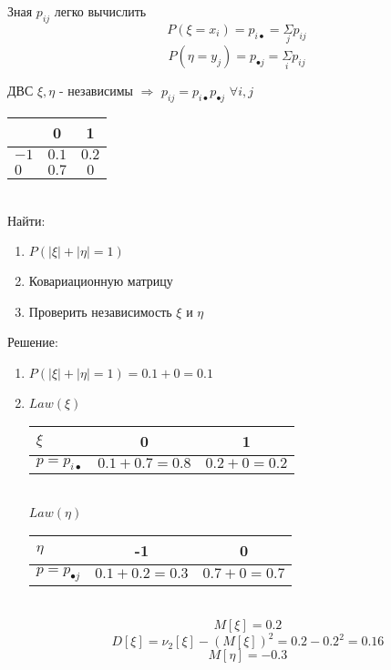 Зная $p_{ij}$ легко вычислить
$$
P(\xi = x_i) = p_{i\bullet} = \underset{j}{\Sigma}p_{ij}
$$
$$
P(\eta = y_j) = p_{\bullet j} = \underset{i}{\Sigma}p_{ij}
$$

\begin{theorem}
    ДВС $\xi,\eta$ - независимы $\Rightarrow$ $p_{ij} = p_{i\bullet}p_{\bullet j}$ $\forall i,j$
\end{theorem}

\begin{example}
    \begin{tabular}{|l|c|c|}
        \hline
        \diagbox{$\eta$}{$\xi$} & 0 & 1 \\ \hline
        $-1$ & $0.1$ & $0.2$ \\ \hline
        $0$ & $0.7$ & $0$ \\ \hline
    \end{tabular} \\
    Найти:
    \begin{enumerate}
        \item $P(|\xi| + |\eta| = 1)$
        \item Ковариационную матрицу
        \item Проверить независимость $\xi$  и $\eta$
    \end{enumerate}
    Решение:
    \begin{enumerate}
        \item $P(|\xi| + |\eta| = 1) = 0.1 + 0 = 0.1$
        \item
            $Law(\xi)$ \\
            \begin{tabular}{|l|c|c|} \hline
                $\xi$ & 0 & 1 \\ \hline
                $p = p_{i\bullet}$ & $0.1 + 0.7 = 0.8$ & $0.2 + 0 = 0.2$ \\ \hline
            \end{tabular}
            \\ $Law(\eta)$ \\
            \begin{tabular}{|l|c|c|} \hline
                $\eta$ & -1 & 0 \\ \hline
                $p = p_{\bullet j}$ & $0.1 + 0.2 = 0.3$ & $0.7 + 0 = 0.7$ \\ \hline
            \end{tabular}
            \\
            $$M[\xi] = 0.2$$
            $$D[\xi] = \nu_2[\xi] - (M[\xi])^2 = 0.2 - 0.2^2 = 0.16$$
            $$M[\eta] = -0.3$$

\end{enumerate}
\end{example}
